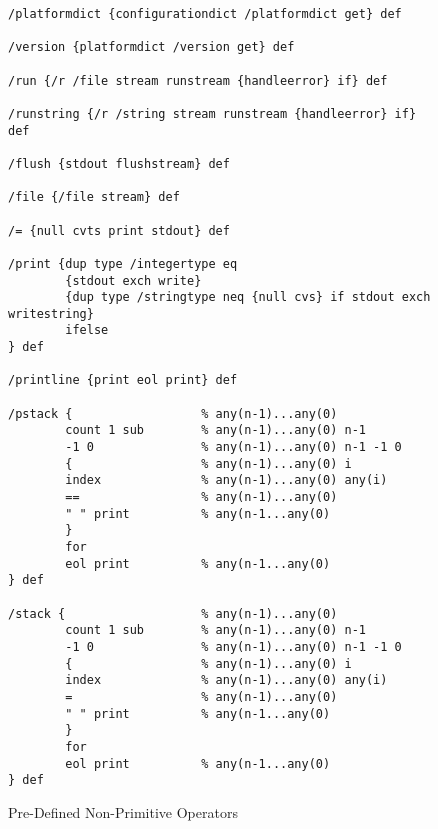 \begin{figure}[p]\centering
\begin{verbatim}
/platformdict {configurationdict /platformdict get} def

/version {platformdict /version get} def

/run {/r /file stream runstream {handleerror} if} def

/runstring {/r /string stream runstream {handleerror} if} def

/flush {stdout flushstream} def

/file {/file stream} def

/= {null cvts print stdout} def

/print {dup type /integertype eq
        {stdout exch write}
        {dup type /stringtype neq {null cvs} if stdout exch writestring}
        ifelse
} def

/printline {print eol print} def

/pstack {                  % any(n-1)...any(0)
        count 1 sub        % any(n-1)...any(0) n-1
        -1 0               % any(n-1)...any(0) n-1 -1 0
        {                  % any(n-1)...any(0) i
        index              % any(n-1)...any(0) any(i)
        ==                 % any(n-1)...any(0)
        " " print          % any(n-1...any(0)
        }
        for
        eol print          % any(n-1...any(0)
} def

/stack {                   % any(n-1)...any(0)
        count 1 sub        % any(n-1)...any(0) n-1
        -1 0               % any(n-1)...any(0) n-1 -1 0
        {                  % any(n-1)...any(0) i
        index              % any(n-1)...any(0) any(i)
        =                  % any(n-1)...any(0)
        " " print          % any(n-1...any(0)
        }
        for
        eol print          % any(n-1...any(0)
} def
\end{verbatim}
\caption{Pre-Defined Non-Primitive Operators}
\label{nonprima}
\end{figure}
